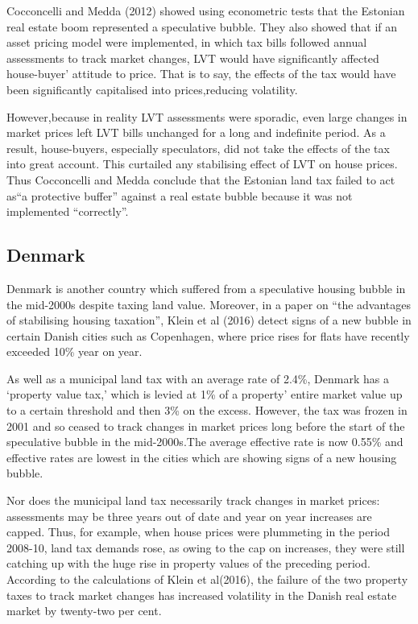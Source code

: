 \documentclass[]{tufte-handout}
\begin{document}
Cocconcelli and Medda (2012) showed using econometric tests that the
Estonian real estate boom represented a speculative bubble. They also
showed that if an asset pricing model were implemented, in which tax
bills followed annual assessments to track market changes, LVT would
have significantly affected house-buyer' attitude to price. That is to
say, the effects of the tax would have been significantly capitalised
into prices,reducing volatility.

However,because in reality LVT assessments were sporadic, even large
changes in market prices left LVT bills unchanged for a long and
indefinite period. As a result, house-buyers, especially speculators,
did not take the effects of the tax into great account. This curtailed
any stabilising effect of LVT on house prices. Thus Cocconcelli and
Medda conclude that the Estonian land tax failed to act as``a protective
buffer'' against a real estate bubble because it was not implemented
``correctly''.

\hypertarget{denmark}{%
\subsection{Denmark}\label{denmark}}

Denmark is another country which suffered from a speculative housing
bubble in the mid-2000s despite taxing land value. Moreover, in a paper
on ``the advantages of stabilising housing taxation'', Klein et al
(2016) detect signs of a new bubble in certain Danish cities such as
Copenhagen, where price rises for flats have recently exceeded 10\% year
on year.

As well as a municipal land tax with an average rate of 2.4\%, Denmark
has a `property value tax,' which is levied at 1\% of a property' entire
market value up to a certain threshold and then 3\% on the excess.
However, the tax was frozen in 2001 and so ceased to track changes in
market prices long before the start of the speculative bubble in the
mid-2000s.The average effective rate is now 0.55\% and effective rates
are lowest in the cities which are showing signs of a new housing
bubble.

Nor does the municipal land tax necessarily track changes in market
prices: assessments may be three years out of date and year on year
increases are capped. Thus, for example, when house prices were
plummeting in the period 2008-10, land tax demands rose, as owing to the
cap on increases, they were still catching up with the huge rise in
property values of the preceding period. According to the calculations
of Klein et al(2016), the failure of the two property taxes to track
market changes has increased volatility in the Danish real estate market
by twenty-two per cent.
\end{document}
